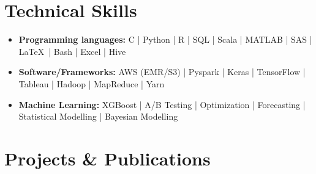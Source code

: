 \documentclass[a4,10pt]{article}
\newcommand{\subtext}[1]{
#1\par\vspace{-0.2cm}}
\newenvironment{zitemize}{
\begin{itemize}\itemsep0pt \parskip0pt \parsep1pt}
{\end{itemize}\vspace{-0.4cm}}
\begin{document}


\vspace{-0.2cm}
\section{Technical Skills}
\vspace{-0.12cm}
\begin{zitemize}
    \item \textbf{Programming languages:} C | Python | R | SQL | Scala | MATLAB | SAS | \LaTeX\ | Bash | Excel | Hive
    \item \textbf{Software/Frameworks:} AWS (EMR/S3) | Pyspark | Keras | TensorFlow | Tableau | Hadoop | MapReduce | Yarn
    \item \textbf{Machine Learning:} XGBoost | A/B Testing | Optimization | Forecasting | Statistical Modelling | Bayesian Modelling
\end{zitemize}

\vspace{-0.2cm}
\section{Projects \& Publications} %
\end{document}
